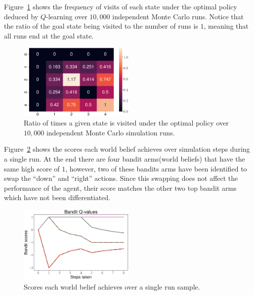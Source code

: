 Figure~\ref{fig:visit_count} shows the frequency of visits of each state under
the optimal policy deduced by $Q$-learning over $10,000$ independent Monte Carlo
runs. Notice that the ratio of the goal state being visited to the number of
runs is $1$, meaning that all runs end at the goal state.
%
\begin{figure}[bth]
    \centering
    \includegraphics[width=0.5\textwidth]{./figures/visit_count_ratio.eps}
    \caption{Ratio of times a given state is visited under the optimal policy over $10,000$ independent Monte Carlo simulation runs.}
    \label{fig:visit_count}
\end{figure}

Figure~\ref{fig:bandit_scores} shows the scores each world belief achieves over
simulation steps during a single run. At the end there are four bandit
arms(world beliefs) that have the same high score of $1$, however, two of these
bandits arms have been identified to swap the ``down'' and ``right'' actions.
Since this swapping does not affect the performance of the agent, their score
matches the other two top bandit arms which have not been differentiated.
%
\begin{figure}[bth]
    \centering
    \includegraphics[width=0.5\textwidth]{./figures/bandit_scores.eps}
    \caption{Scores each world belief achieves over a single run sample.}
    \label{fig:bandit_scores}
\end{figure}